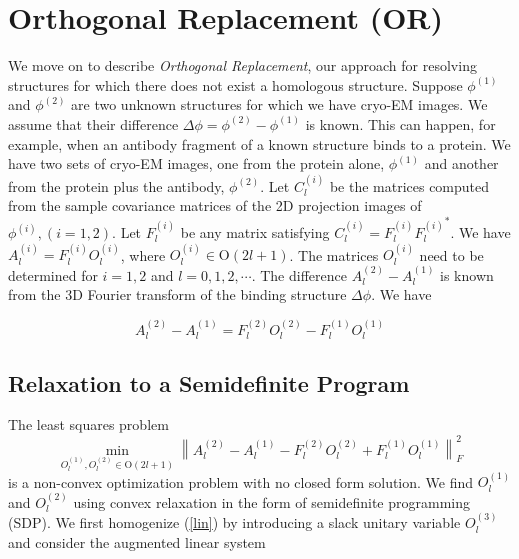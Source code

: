 \documentclass{article}
\begin{document}
\section{Orthogonal Replacement (OR)}
We move on to describe {\em Orthogonal Replacement}, our approach for resolving structures for which there does not exist a homologous structure.  Suppose $\phi^{(1)}$ and $\phi^{(2)}$
are two unknown structures
for which we have cryo-EM images.
We assume that their difference $\Delta \phi =\phi^{(2)} -\phi^{(1)}$ is known.
This can happen, for example, when
an antibody fragment of a known structure binds to a protein. We have two sets
of cryo-EM images, one from the protein alone, $\phi^{(1)}$
and another from the protein plus the antibody, $\phi^{(2)}$. Let $C_l^{(i)}$ be the matrices computed from the sample covariance
matrices of the 2D projection images of $\phi^{(i)}, (i=1,2)$.
Let $F_l^{(i)}$ be any matrix satisfying $C_l^{(i)} = F_l^{(i)}{F_l^{(i)}}^{*}$. We have
$A_l^{(i)} = F_l^{(i)} O_l^{(i)}$, where $O_l^{(i)} \in \text{O}(2l+1)$.
The matrices $O_l^{(i)}$ need to be determined for $i=1,2$ and $l=0,1,2, \cdots$. The
difference $A_l^{(2)} -A_l^{(1)}$ is known from
the 3D Fourier transform of the binding structure $\Delta \phi$. We have

\begin{equation}\label{lin}
A_l^{(2)}-A_l^{(1)}=F_l^{(2)}O_l^{(2)}-F_l^{(1)}O_l^{(1)}
\end{equation}

\subsection{Relaxation to a Semidefinite Program}
The least squares problem
\begin{equation}\label{noncon}
\min_{O_l^{(1)},O_l^{(2)} \in \text{O}(2l+1)}
\left\|A_l^{(2)}-A_l^{(1)}-F_l^{(2)}O_l^{(2)}+F_l^{(1)}O_l^{(1)} \right\|_F^2
\end{equation}
is a non-convex optimization problem with no closed form solution. We find
$O_l^{(1)}$ and $O_l^{(2)}$ using convex relaxation in the form of
semidefinite programming (SDP). We first homogenize (\ref{lin}) by introducing a
slack unitary variable $O_l^{(3)}$ and consider
the augmented linear system
\end{document}
